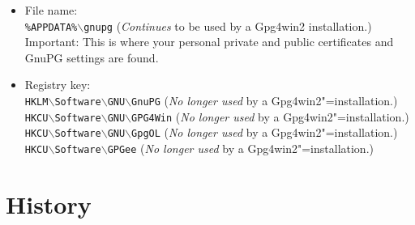 \documentclass[a4paper,11pt,oneside,openright,titlepage]{scrbook}
\newcommand{\Filename}[1]{\small{\texttt{#1}}\normalsize}
\begin{document}
\begin{itemize}
    \item File name:\\
        \Filename{\%APPDATA\%$\backslash$gnupg} (\textit{Continues} to
        be used by a Gpg4win2 installation.)\\
        Important: This is where your personal private and public
        certificates and GnuPG settings are found.

    \item Registry key:\\
        \Filename{HKLM$\backslash$Software$\backslash$GNU$\backslash$GnuPG}
        (\textit{No longer used} by a Gpg4win2"=installation.)\\
        \Filename{HKCU$\backslash$Software$\backslash$GNU$\backslash$GPG4Win}
        (\textit{No longer used} by a Gpg4win2"=installation.)\\
        \Filename{HKCU$\backslash$Software$\backslash$GNU$\backslash$GpgOL}
        (\textit{No longer used} by a Gpg4win2"=installation.)\\
        \Filename{HKCU$\backslash$Software$\backslash$GPGee}
        (\textit{No longer used} by a Gpg4win2"=installation.)\\
\end{itemize}


\clearpage
\chapter{History}
\end{document}
